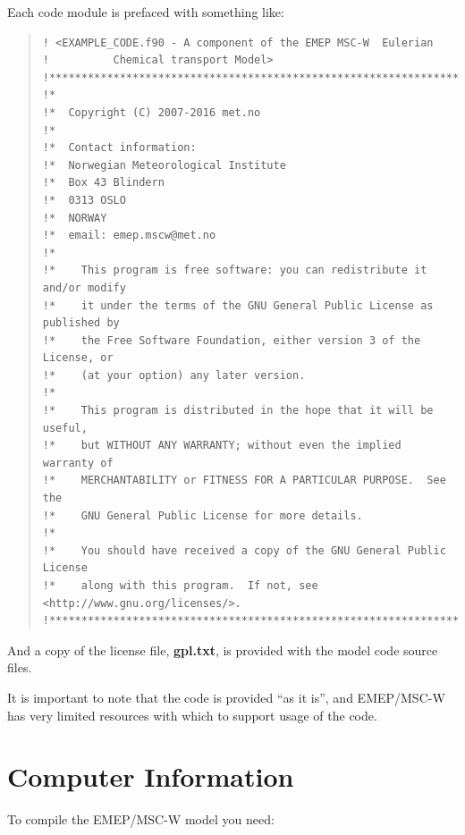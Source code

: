 \documentclass[a4paper,12pt]{report}
\begin{document}
Each code module is prefaced with something like:\\
\bigskip

\begin{quote}
\begin{footnotesize}
\begin{verbatim}
! <EXAMPLE_CODE.f90 - A component of the EMEP MSC-W  Eulerian
!          Chemical transport Model>
!*******************************************************************!
!*
!*  Copyright (C) 2007-2016 met.no
!*
!*  Contact information:
!*  Norwegian Meteorological Institute
!*  Box 43 Blindern
!*  0313 OSLO
!*  NORWAY
!*  email: emep.mscw@met.no
!*
!*    This program is free software: you can redistribute it and/or modify
!*    it under the terms of the GNU General Public License as published by
!*    the Free Software Foundation, either version 3 of the License, or
!*    (at your option) any later version.
!*
!*    This program is distributed in the hope that it will be useful,
!*    but WITHOUT ANY WARRANTY; without even the implied warranty of
!*    MERCHANTABILITY or FITNESS FOR A PARTICULAR PURPOSE.  See the
!*    GNU General Public License for more details.
!*
!*    You should have received a copy of the GNU General Public License
!*    along with this program.  If not, see <http://www.gnu.org/licenses/>.
!*******************************************************************!
\end{verbatim}
\end{footnotesize}
\end{quote}

And a copy of the license file, {\bf gpl.txt}, is provided with the
model code source files.

\noindent It is important to note that the code is provided ``as it is'', 
and EMEP/MSC-W has very limited resources with which to support
usage of the code. 


\newpage

\section{Computer Information}
\label{sec:compinf}

To compile the EMEP/MSC-W model you need:\\
\end{document}
